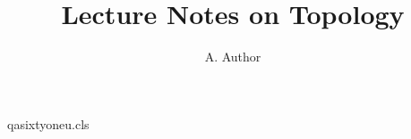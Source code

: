 \begin{filecontents*}[overwrite]{qasixtyoneu.cls}
\newcommand\course[1]{\gdef\@course{#1}}
\renewcommand\@maketitle{\begin{center}{\LARGE \@title \par}
  {\large \@course \par}{\large \@author \par}\end{center}\par}
\end{filecontents*}
\documentclass{qasixtyoneu}
\title{Lecture Notes on Topology}
\author{A. Author}

\maketitle
Text.

